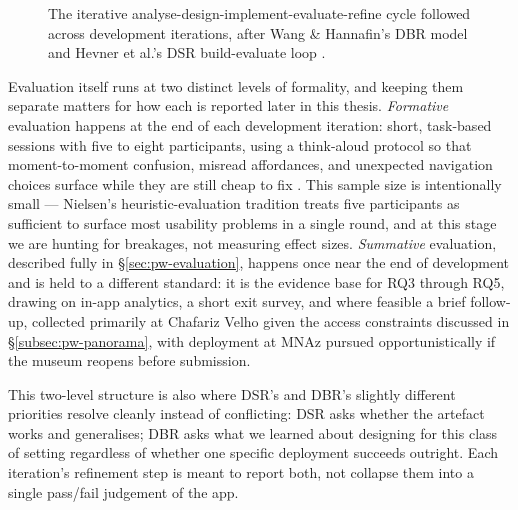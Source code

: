\begin{figure}[h]
\centering
{}
\caption{The iterative analyse-design-implement-evaluate-refine cycle followed across development iterations, after Wang \& Hannafin's DBR model \cite{wanghannafin2005} and Hevner et al.'s DSR build-evaluate loop \cite{hevner2004}.}
\label{fig:dbr-cycle}
\end{figure}
 
Evaluation itself runs at two distinct levels of formality, and keeping
them separate matters for how each is reported later in this thesis.
\emph{Formative} evaluation happens at the end of each development
iteration: short, task-based sessions with five to eight participants,
using a think-aloud protocol so that moment-to-moment confusion,
misread affordances, and unexpected navigation choices surface while they
are still cheap to fix \cite{nielsen1994}. This sample size is
intentionally small — Nielsen's heuristic-evaluation tradition treats five
participants as sufficient to surface most usability problems in a single
round, and at this stage we are hunting for breakages, not measuring
effect sizes. \emph{Summative} evaluation, described fully in
\S\ref{sec:pw-evaluation}, happens once near the end of development and
is held to a different standard: it is the evidence base for RQ3 through
RQ5, drawing on in-app analytics, a short exit survey, and where feasible
a brief follow-up, collected primarily at Chafariz Velho given the access
constraints discussed in \S\ref{subsec:pw-panorama}, with deployment at
MNAz pursued opportunistically if the museum reopens before submission.
 
This two-level structure is also where DSR's and DBR's slightly different
priorities resolve cleanly instead of conflicting: DSR asks whether the
artefact works and generalises; DBR asks what we learned about designing
for this class of setting regardless of whether one specific deployment
succeeds outright. Each iteration's refinement step is meant to report
both, not collapse them into a single pass/fail judgement of the app.




















